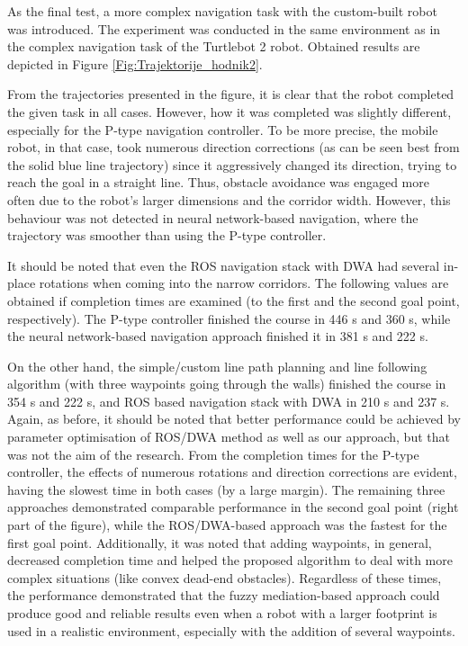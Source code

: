 As the final test, a more complex navigation task with the custom-built robot was introduced. The experiment was conducted in the same environment as in the complex navigation task of the Turtlebot 2 robot. Obtained results are depicted in Figure \ref{Fig:Trajektorije_hodnik2}.

From the trajectories presented in the figure, it is clear that the robot completed the given task in all cases. However, how it was completed was slightly different, especially for the P-type navigation controller. To be more precise, the mobile robot, in that case, took numerous direction corrections (as can be seen best from the solid blue line trajectory) since it aggressively changed its direction, trying to reach the goal in a straight line. Thus, obstacle avoidance was engaged more often due to the robot's larger dimensions and the corridor width. However, this behaviour was not detected in neural network-based navigation, where the trajectory was smoother than using the P-type controller.

It should be noted that even the ROS navigation stack with DWA had several in-place rotations when coming into the narrow corridors. The following values are obtained if completion times are examined (to the first and the second goal point, respectively). The P-type controller finished the course in 446 s and 360 s, while the neural network-based navigation approach finished it in 381 s and 222 s.

On the other hand, the simple/custom line path planning and line following algorithm (with three waypoints going through the walls) finished the course in 354 s and 222 s, and ROS based navigation stack with DWA in 210 s and 237 s. Again, as before, it should be noted that better performance could be achieved by parameter optimisation of ROS/DWA method as well as our approach, but that was not the aim of the research. From the completion times for the P-type controller, the effects of numerous rotations and direction corrections are evident, having the slowest time in both cases (by a large margin). The remaining three approaches demonstrated comparable performance in the second goal point (right part of the figure), while the ROS/DWA-based approach was the fastest for the first goal point. Additionally, it was noted that adding waypoints, in general, decreased completion time and helped the proposed algorithm to deal with more complex situations (like convex dead-end obstacles). Regardless of these times, the performance demonstrated that the fuzzy mediation-based approach could produce good and reliable results even when a robot with a larger footprint is used in a realistic environment, especially with the addition of several waypoints.

